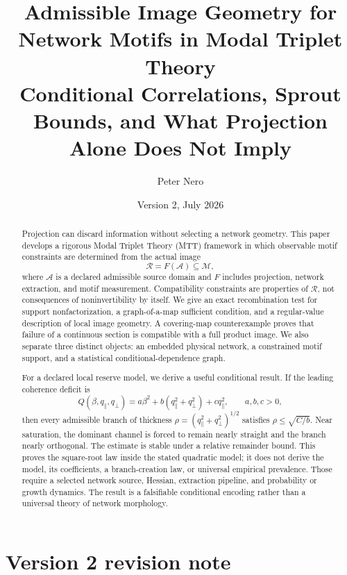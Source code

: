 \documentclass[11pt]{article}
\title{\textbf{Admissible Image Geometry for Network Motifs in Modal Triplet Theory}\\
\large Conditional Correlations, Sprout Bounds, and What Projection Alone Does Not Imply}
\author{Peter Nero}
\date{Version 2, July 2026}
\newcommand{\Adm}{\mathcal A}
\newcommand{\Image}{\mathcal R}
\newcommand{\Motif}{\mathcal M}
\begin{document}
\maketitle

\begin{abstract}
Projection can discard information without selecting a network geometry.
This paper develops a rigorous Modal Triplet Theory (MTT) framework in which
observable motif constraints are determined from the actual image
\[
  \Image=F(\Adm)\subseteq\Motif,
\]
where $\Adm$ is a declared admissible source domain and
$F$ includes projection, network extraction, and motif measurement.
Compatibility constraints are properties of $\Image$, not consequences of
noninvertibility by itself.  We give an exact recombination test for support
nonfactorization, a graph-of-a-map sufficient condition, and a regular-value
description of local image geometry.  A covering-map counterexample proves
that failure of a continuous section is compatible with a full product
image.  We also separate three distinct objects: an embedded
physical network, a constrained motif support, and a statistical
conditional-dependence graph.

For a declared local reserve model, we derive a useful conditional result.
If the leading coherence deficit is
\[
  Q(\beta,q_\parallel,q_\perp)
  =a\beta^2+b(q_\parallel^2+q_\perp^2)+cq_\parallel^2,
  \qquad a,b,c>0,
\]
then every admissible branch of thickness
$\rho=(q_\parallel^2+q_\perp^2)^{1/2}$ satisfies
$\rho\leq\sqrt{C/b}$.  Near saturation, the dominant channel is forced to
remain nearly straight and the branch nearly orthogonal.  The estimate is
stable under a relative remainder bound.  This proves the square-root law
inside the stated quadratic model; it does not derive the model, its
coefficients, a branch-creation law, or universal empirical prevalence.
Those require a selected network source, Hessian, extraction pipeline, and
probability or growth dynamics.  The result is a falsifiable conditional
encoding rather than a universal theory of network morphology.
\end{abstract}

\section*{Version 2 revision note}
\end{document}
